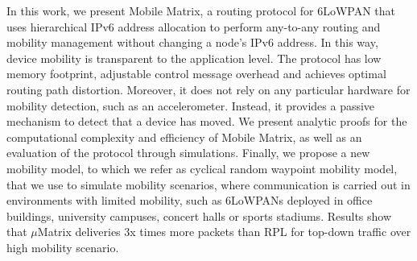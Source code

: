 In this work, we present Mobile Matrix, a routing protocol for 6LoWPAN that uses hierarchical IPv6 address allocation to perform any-to-any routing and mobility management without changing a node's IPv6 address. In this way, device mobility is transparent to the application level. The protocol has low memory footprint, adjustable control message overhead and achieves optimal routing path distortion. Moreover, it does not rely on any particular hardware for mobility detection, such as an accelerometer. Instead, it provides a passive mechanism to detect that a device has moved. We present analytic proofs for the computational complexity and efficiency of Mobile Matrix, as well as an evaluation of the protocol through simulations. Finally, we propose a new mobility model, to which we refer as cyclical random waypoint mobility model, that we use to simulate mobility scenarios, where communication is carried out in environments with limited mobility, such as 6LoWPANs deployed in office buildings, university campuses, concert halls or sports stadiums. Results show that $\mu$Matrix deliveries 3x times more packets than RPL for top-down traffic over high mobility scenario.